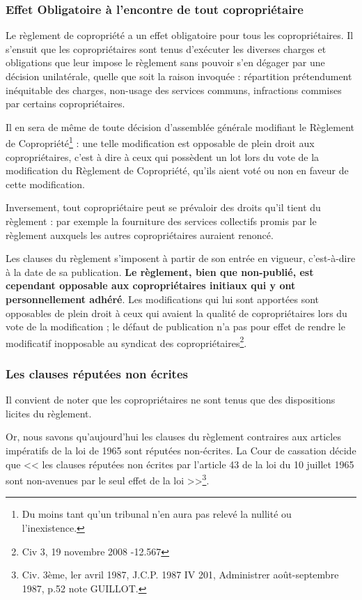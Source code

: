 		\subsubsection{Effet Obligatoire à l’encontre de tout copropriétaire}
		
			Le règlement de copropriété a un effet obligatoire pour tous les copropriétaires. Il s'ensuit que les copropriétaires sont tenus d'exécuter les diverses charges et obligations que leur impose le règlement sans pouvoir s'en dégager par une décision unilatérale, quelle que soit la raison invoquée : répartition prétendument inéquitable des charges, non-usage des services communs, infractions commises par certains copropriétaires.
			
			Il en sera de même de toute décision d’assemblée générale modifiant le Règlement de Copropriété\footnote{Du moins tant qu’un tribunal n’en aura pas relevé la nullité ou l’inexistence.} : une telle modification est opposable de plein droit aux copropriétaires, c’est à dire à ceux qui possèdent un lot lors du vote de la modification du Règlement de Copropriété, qu’ils aient voté ou non en faveur de cette modification.
			
			Inversement, tout copropriétaire peut se prévaloir des droits qu'il tient du règlement : par exemple la fourniture des services collectifs promis par le règlement auxquels les autres copropriétaires auraient renoncé.
			
			Les clauses du règlement s'imposent à partir de son entrée en vigueur, c'est-à-dire à la date de sa publication. {\bfseries Le règlement, bien que non-publié, est cependant opposable aux copropriétaires initiaux qui y ont personnellement adhéré}. Les modifications qui lui sont apportées sont opposables de plein droit à ceux qui avaient la qualité de copropriétaires lors du vote de la modification ; le défaut de publication n’a pas pour effet de rendre le modificatif inopposable au syndicat des copropriétaires\footnote{Civ 3\degres, 19 novembre 2008 -12.567}.
		
		\subsubsection{Les clauses réputées non écrites}
		
			Il convient de noter que les copropriétaires ne sont tenus que des dispositions licites du règlement.
	
			Or, nous savons qu'aujourd'hui les clauses du règlement contraires aux articles impératifs de la loi de 1965 sont réputées non-écrites. La Cour de cassation décide que << les clauses réputées non écrites par l'article 43 de la loi du 10 juillet 1965 sont non-avenues par le seul effet de la loi >>\footnote{Civ. 3ème, ler avril 1987, J.C.P. 1987 IV 201, Administrer août-septembre 1987, p.52 note GUILLOT.}.
			
